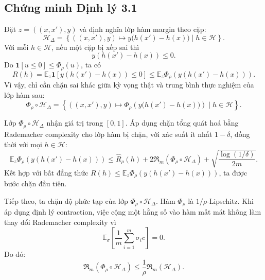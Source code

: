 \subsection{Chứng minh Định lý 3.1}

Đặt \(z=((x,x'),y)\) và định nghĩa lớp hàm margin theo cặp:
\[
    \mathcal{H}_{\Delta}
    =
    \left\{
        ((x,x'),y)
        \mapsto
        y\big(h(x')-h(x)\big)
        \mid
        h\in\mathcal{H}
    \right\}.
\]
Với mỗi \(h\in\mathcal{H}\), nếu một cặp bị xếp sai thì
\[
    y(h(x')-h(x))\leq 0.
\]
Do \(\mathbf{1}[u\leq 0]\leq \Phi_{\rho}(u)\), ta có
\[
    R(h)
    =
    \mathbb{E}_{z}
    \mathbf{1}
    \left[
        y(h(x')-h(x))\leq 0
    \right]
    \leq
    \mathbb{E}_{z}
    \Phi_{\rho}
    \left(
        y(h(x')-h(x))
    \right).
\]
Vì vậy, chỉ cần chặn sai khác giữa kỳ vọng thật và trung bình thực nghiệm của lớp hàm sau:
\[
    \Phi_{\rho}\circ\mathcal{H}_{\Delta}
    =
    \left\{
        ((x,x'),y)
        \mapsto
        \Phi_{\rho}
        \left(
            y\big(h(x')-h(x)\big)
        \right)
        \mid
        h\in\mathcal{H}
    \right\}.
\]

Lớp \(\Phi_{\rho}\circ\mathcal{H}_{\Delta}\) nhận giá trị trong \([0,1]\). Áp dụng chặn tổng quát hoá bằng Rademacher complexity cho lớp hàm bị chặn, với xác suất ít nhất \(1-\delta\), đồng thời với mọi \(h\in\mathcal{H}\):
\[
    \mathbb{E}_{z}
    \Phi_{\rho}
    \left(
        y(h(x')-h(x))
    \right)
    \leq
    \widehat{R}_{\rho}(h)
    +
    2
    \mathfrak{R}_m
    \left(
        \Phi_{\rho}\circ\mathcal{H}_{\Delta}
    \right)
    +
    \sqrt{
        \frac{\log(1/\delta)}{2m}
    }.
\]
Kết hợp với bất đẳng thức \(R(h)\leq \mathbb{E}_{z}\Phi_{\rho}(y(h(x')-h(x)))\), ta được bước chặn đầu tiên.

Tiếp theo, ta chặn độ phức tạp của lớp \(\Phi_{\rho}\circ\mathcal{H}_{\Delta}\). Hàm \(\Phi_{\rho}\) là \(1/\rho\)-Lipschitz. Khi áp dụng định lý contraction, việc cộng một hằng số vào hàm mất mát không làm thay đổi Rademacher complexity vì
\[
    \mathbb{E}_{\sigma}
    \left[
        \frac{1}{m}
        \sum_{i=1}^{m}
        \sigma_i c
    \right]
    =
    0.
\]
Do đó:
\[
    \mathfrak{R}_m
    \left(
        \Phi_{\rho}\circ\mathcal{H}_{\Delta}
    \right)
    \leq
    \frac{1}{\rho}
    \mathfrak{R}_m(\mathcal{H}_{\Delta}).
\]

